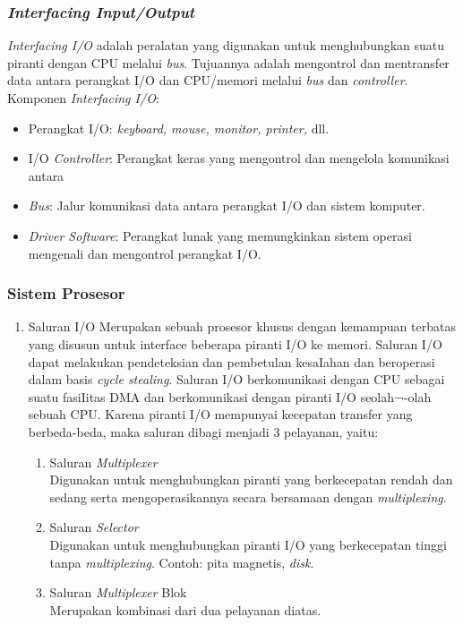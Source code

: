 \documentclass[12pt]{article}
\begin{document}
\subsubsection{\textit{Interfacing Input/Output}}
\textit{Interfacing I/O} adalah peralatan yang digunakan untuk menghubungkan suatu piranti dengan CPU melalui \textit{bus}. Tujuannya adalah mengontrol dan mentransfer data antara perangkat I/O dan CPU/memori melalui \textit{bus} dan \textit{controller}.
Komponen \textit{Interfacing I/O}:
\begin{itemize}
    \item Perangkat I/O: \textit{keyboard, mouse, monitor, printer,} dll.
    \item I/O \textit{Controller}: Perangkat keras yang mengontrol dan mengelola komunikasi antara 
    \item \textit{Bus}: Jalur komunikasi data antara perangkat I/O dan sistem komputer.
    \item \textit{Driver Software}: Perangkat lunak yang memungkinkan sistem operasi mengenali dan mengontrol perangkat I/O.
\end{itemize}

\subsubsection{Sistem Prosesor}
\begin{enumerate}
    \item {Saluran I/O}
Merupakan sebuah prosesor khusus dengan kemampuan terbatas yang disusun untuk interface beberapa piranti I/O ke memori. Saluran I/O dapat melakukan pendeteksian dan pembetulan kesaIahan dan beroperasi dalam basis \textit{cycle stealing}. Saluran I/O berkomunikasi dengan CPU sebagai suatu fasiIitas DMA dan berkomunikasi dengan piranti I/O seolah¬-olah sebuah CPU. Karena piranti I/O mempunyai kecepatan transfer yang berbeda-beda, maka saluran dibagi menjadi 3 pelayanan, yaitu:
\begin{enumerate}
    \item Saluran \textit{Multiplexer} \\
    Digunakan untuk menghubungkan piranti yang berkecepatan rendah dan sedang serta mengoperasikannya secara bersamaan dengan \textit{multiplexing}.
    \item  Saluran \textit{Selector} \\
    Digunakan untuk menghubungkan piranti I/O yang berkecepatan tinggi tanpa \textit{multiplexing}. Contoh: pita magnetis, \textit{disk}.
    \item Saluran \textit{Multiplexer} Blok \\
    Merupakan kombinasi dari dua pelayanan diatas.
\end{enumerate}
\end{enumerate}
\end{document}
